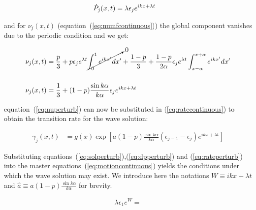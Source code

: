 \begin{align}
    \dot{P}_j(x,t) &= \lambda\epsilon_j e^{ikx + \lambda t}
    \label{eq:dpperturb}
\end{align}

\noindent and for $\nu_j(x,t)$ (equation~(\ref{eq:numfcontinuous})) the global component vanishes due to the periodic condition and we
get:

\begin{align}
    \nu_j(x,t) &= \frac{p}{3} + p\epsilon_je^{\lambda t}\cancelto{0}{\int_0^1 e^{ikx'}dx'} +
    \frac{1-p}{3} + \frac{1-p}{2\alpha} \epsilon_je^{\lambda t}\int_{x-\alpha}^{x+\alpha}e^{ikx'}dx' \notag\\[14pt]
    \nu_j(x,t) &= \frac{1}{3} + (1-p)\frac{\sin k\alpha}{k\alpha}\epsilon_je^{ikx+\lambda t}
    \label{eq:nuperturb}
\end{align}

\noindent equation~(\ref{eq:nuperturb}) can now be substituted in (\ref{eq:ratecontinuous}) to obtain the transition rate for the wave
solution:

\begin{align}
    \gamma_j(x,t) &= g(x)\exp\left[ a(1-p)\frac{\sin k\alpha}{k\alpha}(\epsilon_{j-1}-\epsilon_j)e^{ikx+\lambda t} \right]
    \label{eq:rateperturb}
\end{align}

Substituting equations~(\ref{eq:solperturb}),(\ref{eq:dpperturb}) and (\ref{eq:rateperturb}) into the master
equations~(\ref{eq:motioncontinuous}) yields the conditions under which the wave solution may exist. We introduce here the notations
$W\equiv ikx + \lambda t$ and $\hat{a}\equiv a(1-p)\frac{\sin k\alpha}{k\alpha}$ for brevity.

\begin{align}
    \lambda \epsilon_1 e^W = 
\end{align}
